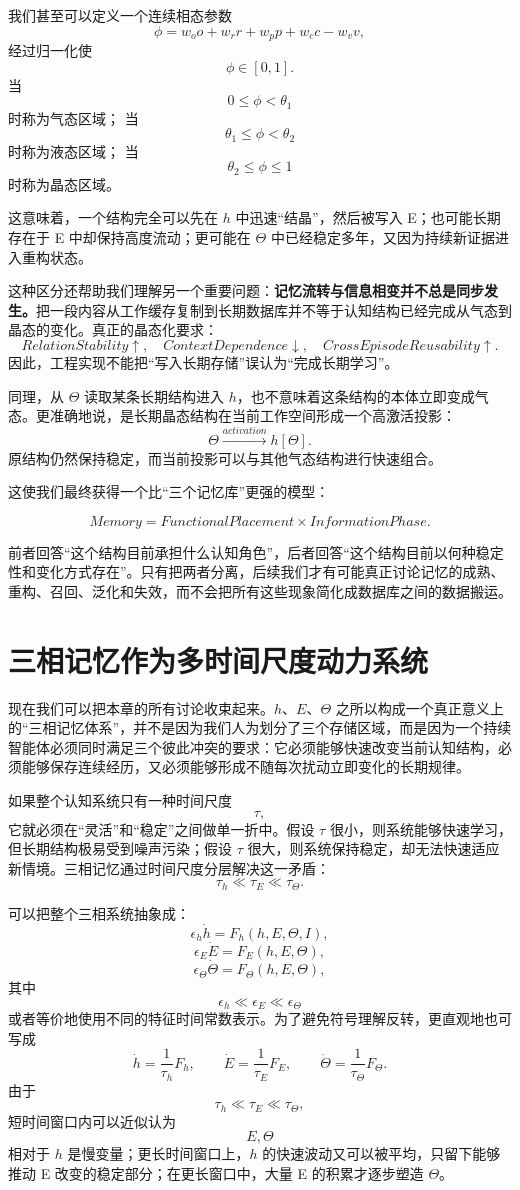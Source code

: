 我们甚至可以定义一个连续相态参数
\[
\phi
=
w_o o
+
w_r r
+
w_p p
+
w_c c
-
w_v v,
\]
经过归一化使
\[
\phi\in[0,1].
\]
当
\[
0\leq\phi<\theta_1
\]
时称为气态区域；
当
\[
\theta_1\leq\phi<\theta_2
\]
时称为液态区域；
当
\[
\theta_2\leq\phi\leq1
\]
时称为晶态区域。

这意味着，一个结构完全可以先在 $h$ 中迅速“结晶”，然后被写入 E；也可能长期存在于 E 中却保持高度流动；更可能在 $\Theta$ 中已经稳定多年，又因为持续新证据进入重构状态。

这种区分还帮助我们理解另一个重要问题：\textbf{记忆流转与信息相变并不总是同步发生。}把一段内容从工作缓存复制到长期数据库并不等于认知结构已经完成从气态到晶态的变化。真正的晶态化要求：
\[
RelationStability\uparrow,
\quad
ContextDependence\downarrow,
\quad
CrossEpisodeReusability\uparrow.
\]
因此，工程实现不能把“写入长期存储”误认为“完成长期学习”。

同理，从 $\Theta$ 读取某条长期结构进入 $h$，也不意味着这条结构的本体立即变成气态。更准确地说，是长期晶态结构在当前工作空间形成一个高激活投影：
\[
\Theta
\xrightarrow{activation}
h[\Theta].
\]
原结构仍然保持稳定，而当前投影可以与其他气态结构进行快速组合。

这使我们最终获得一个比“三个记忆库”更强的模型：

\[
\boxed{
Memory
=
FunctionalPlacement
\times
InformationPhase.
}
\]

前者回答“这个结构目前承担什么认知角色”，后者回答“这个结构目前以何种稳定性和变化方式存在”。只有把两者分离，后续我们才有可能真正讨论记忆的成熟、重构、召回、泛化和失效，而不会把所有这些现象简化成数据库之间的数据搬运。


\section{三相记忆作为多时间尺度动力系统}

现在我们可以把本章的所有讨论收束起来。$h$、$E$、$\Theta$ 之所以构成一个真正意义上的“三相记忆体系”，并不是因为我们人为划分了三个存储区域，而是因为一个持续智能体必须同时满足三个彼此冲突的要求：它必须能够快速改变当前认知结构，必须能够保存连续经历，又必须能够形成不随每次扰动立即变化的长期规律。

如果整个认知系统只有一种时间尺度
\[
\tau,
\]
它就必须在“灵活”和“稳定”之间做单一折中。假设 $\tau$ 很小，则系统能够快速学习，但长期结构极易受到噪声污染；假设 $\tau$ 很大，则系统保持稳定，却无法快速适应新情境。三相记忆通过时间尺度分层解决这一矛盾：
\[
\boxed{
\tau_h
\ll
\tau_E
\ll
\tau_\Theta.
}
\]

可以把整个三相系统抽象成：
\[
\epsilon_h\dot h
=
F_h(h,E,\Theta,I),
\]
\[
\epsilon_E\dot E
=
F_E(h,E,\Theta),
\]
\[
\epsilon_\Theta\dot\Theta
=
F_\Theta(h,E,\Theta),
\]
其中
\[
\epsilon_h
\ll
\epsilon_E
\ll
\epsilon_\Theta
\]
或者等价地使用不同的特征时间常数表示。为了避免符号理解反转，更直观地也可写成
\[
\dot h
=
\frac{1}{\tau_h}F_h,
\qquad
\dot E
=
\frac{1}{\tau_E}F_E,
\qquad
\dot\Theta
=
\frac{1}{\tau_\Theta}F_\Theta.
\]
由于
\[
\tau_h\ll\tau_E\ll\tau_\Theta,
\]
短时间窗口内可以近似认为
\[
E,\Theta
\]
相对于 $h$ 是慢变量；更长时间窗口上，$h$ 的快速波动又可以被平均，只留下能够推动 E 改变的稳定部分；在更长窗口中，大量 E 的积累才逐步塑造 $\Theta$。

